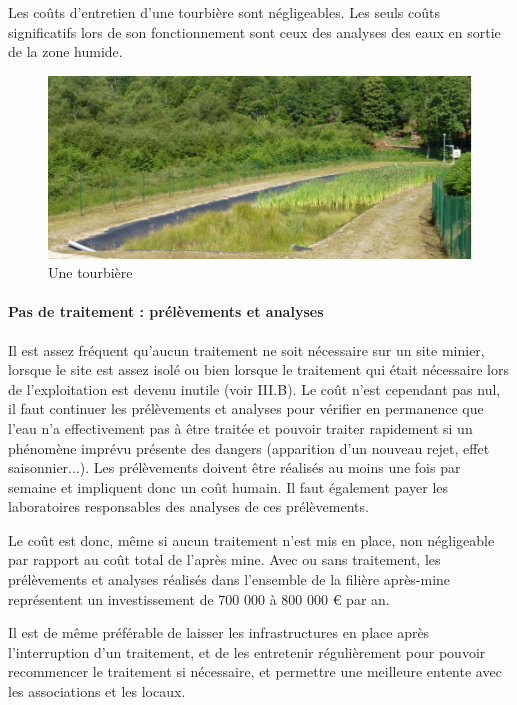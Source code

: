 \documentclass{article}
\begin{document}
Les coûts d’entretien d’une tourbière sont négligeables. Les seuls coûts significatifs lors de son fonctionnement sont ceux des analyses des eaux en sortie de la zone humide.


\begin{figure}[H]
\centering
\includegraphics[width=0.8\linewidth]{III_A_4.png}
\caption{Une tourbière}
\label{fig:tourbiere}
\end{figure}


\paragraph{Pas de traitement : prélèvements et analyses}

Il est assez fréquent qu’aucun traitement ne soit nécessaire sur un site minier, lorsque le site est assez isolé ou bien lorsque le traitement qui était nécessaire lors de l’exploitation est devenu inutile (voir III.B). Le coût n’est cependant pas nul, il faut continuer les prélèvements et analyses pour vérifier en permanence que l’eau n’a effectivement pas à être traitée et pouvoir traiter rapidement si un phénomène imprévu présente des dangers (apparition d’un nouveau rejet, effet saisonnier...). Les prélèvements doivent être réalisés au moins une fois par semaine et impliquent donc un coût humain. Il faut également payer les laboratoires responsables des analyses de ces prélèvements.


Le coût est donc, même si aucun traitement n’est mis en place, non négligeable  par rapport au coût total de l’après mine. Avec ou sans traitement, les prélèvements et analyses réalisés dans l’ensemble de la filière après-mine représentent un investissement de 700 000 à 800 000 € par an.


Il est de même préférable de laisser les infrastructures en place après l'interruption d’un traitement, et de les entretenir régulièrement pour pouvoir recommencer le traitement si nécessaire, et permettre  une meilleure entente avec les associations et les locaux. 
\end{document}
